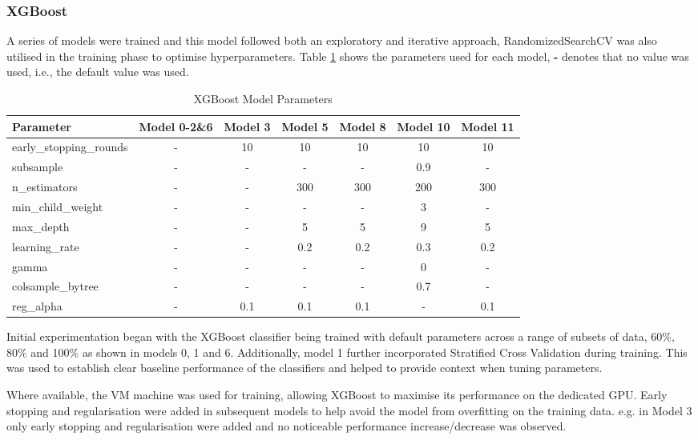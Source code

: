 \newpage

\subsubsection{XGBoost}
\label{sec:xgboost}

A series of models were trained and this model followed both an exploratory and iterative approach, RandomizedSearchCV was also utilised in the training phase to optimise hyperparameters. Table \ref{tab:xgboost-parameters} shows the parameters used for each model, \textbf{-} denotes that no value was used, i.e., the default value was used.

\begin{table}[h]
  \centering
  \caption{XGBoost Model Parameters}
  \label{tab:xgboost-parameters}
  \begin{tabular}{lcccccc}
    \toprule
    Parameter & Model 0-2\&6 & Model 3 & Model 5 & Model 8 & Model 10 & Model 11 \\
    \midrule
    early\_stopping\_rounds & - & 10 & 10 & 10 & 10 & 10 \\
    subsample & - & - & - & - & 0.9 & - \\
    n\_estimators & - & - & 300 & 300 & 200 & 300 \\
    min\_child\_weight & - & - & - & - & 3 & - \\
    max\_depth & - & - & 5 & 5 & 9 & 5 \\
    learning\_rate & - & - & 0.2 & 0.2 & 0.3 & 0.2 \\
    gamma & - & - & - & - & 0 & - \\
    colsample\_bytree & - & - & - & - & 0.7 & - \\
    reg\_alpha & - & 0.1 & 0.1 & 0.1 & - & 0.1 \\
    \bottomrule
  \end{tabular}
\end{table}


\medskip

Initial experimentation began with the XGBoost classifier being trained with default parameters across a range of subsets of data, 60\%, 80\% and 100\% as shown in models 0, 1 and 6. Additionally, model 1 further incorporated Stratified Cross Validation during training. This was used to establish clear baseline performance of the classifiers and helped to provide context when tuning parameters.

Where available, the VM machine was used for training, allowing XGBoost to maximise its performance on the dedicated GPU. Early stopping and regularisation were added in subsequent models to help avoid the model from overfitting on the training data. e.g. in Model 3 only early stopping and regularisation were added and no noticeable performance increase/decrease was observed. 

